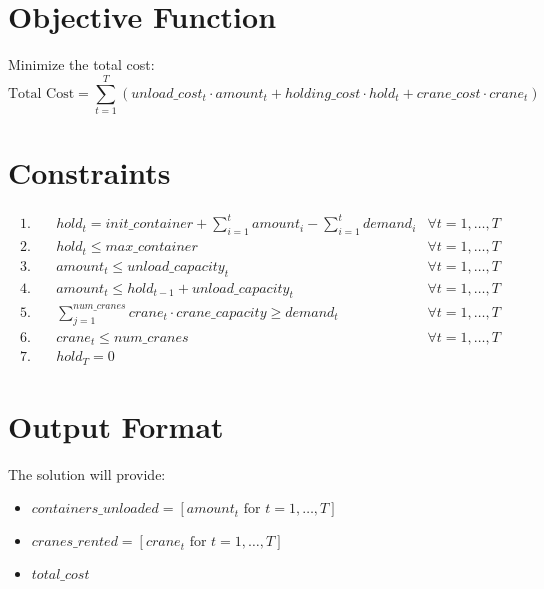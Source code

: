 \documentclass{article}
\begin{document}
\section*{Objective Function}
Minimize the total cost:
\[
\text{Total Cost} = \sum_{t=1}^{T} (unload\_cost_t \cdot amount_t + holding\_cost \cdot hold_t + crane\_cost \cdot crane_t)
\]

\section*{Constraints}
\begin{align*}
1. & \quad hold_t = init\_container + \sum_{i=1}^{t} amount_i - \sum_{i=1}^{t} demand_i & \forall t = 1, \ldots, T \\
2. & \quad hold_t \leq max\_container & \forall t = 1, \ldots, T \\
3. & \quad amount_t \leq unload\_capacity_t & \forall t = 1, \ldots, T \\
4. & \quad amount_t \leq hold_{t-1} + unload\_capacity_t & \forall t = 1, \ldots, T \\
5. & \quad \sum_{j=1}^{num\_cranes} crane_t \cdot crane\_capacity \geq demand_t & \forall t = 1, \ldots, T \\
6. & \quad crane_t \leq num\_cranes & \forall t = 1, \ldots, T \\
7. & \quad hold_T = 0
\end{align*}

\section*{Output Format}
The solution will provide:
\begin{itemize}
    \item $containers\_unloaded = [amount_t \text{ for } t = 1, \ldots, T]$
    \item $cranes\_rented = [crane_t \text{ for } t = 1, \ldots, T]$
    \item $total\_cost$
\end{itemize}
\end{document}
